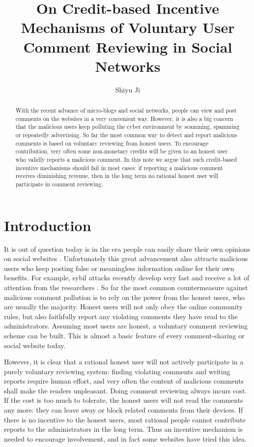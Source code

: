 \documentclass[12pt]{article}
\begin{document}
\title{\Large\bf On Credit-based Incentive Mechanisms of Voluntary User Comment Reviewing in Social Networks}
\author{Shiyu Ji}
\date{}
\maketitle

\begin{abstract}
With the recent advance of micro-blogs and social networks, people can view and post comments on the websites in a very convenient way.
However, it is also a big concern that the malicious users keep polluting the cyber environment by scamming, spamming or repeatedly advertising.
So far the most common way to detect and report malicious comments is based on voluntary reviewing from honest users. 
To encourage contribution, very often some non-monetary credits will be given to an honest user who validly reports a malicious comment. 
In this note we argue that such credit-based incentive mechanisms should fail in most cases:
if reporting a malicious comment receives diminishing revenue, then in the long term no rational honest user will participate in comment reviewing.
\end{abstract}

\section{Introduction}
It is out of question today is in the era people can easily share their own opinions on social websites \cite{E07,ECL07}. Unfortunately this great advancement also attracts malicious users who keep posting false or meaningless information online for their own benefits. For example, sybil attacks recently develop very fast and receive a lot of attention from the researchers \cite{D02,N04}. So far the most common countermeasure against malicious comment pollution is to rely on the power from the honest users, who are usually the majority. Honest users will not only obey the online community rules, but also faithfully report any violating comments they have read to the administrators. Assuming most users are honest, a voluntary comment reviewing scheme can be built. This is almost a basic feature of every comment-sharing or social website today.

However, it is clear that a rational honest user will not actively participate in a purely voluntary reviewing system: finding violating comments and writing reports require human effort, and very often the content of malicious comments shall make the readers unpleasant. Doing comment reviewing always incurs cost. If the cost is too much to tolerate, the honest users will not read the comments any more: they can leave away or block related comments from their devices. If there is no incentive to the honest users, most rational people cannot contribute reports to the administrators in the long term. Thus an incentive mechanism is needed to encourage involvement, and in fact some websites have tried this idea.
\end{document}
